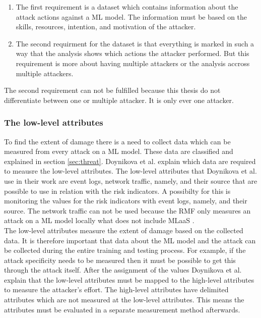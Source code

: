 \begin{enumerate}
  \item The first requirement is a dataset which contains information about the attack actions against a ML model. The information must be based on the skills, resources, intention, and motivation of the attacker.
  \item The second requirment for the dataset is that everything is marked in such a way that the analysis shows which actions the attacker performed. But this requirement is more about having multiple attackers or the analysis accross multiple attackers.
\end{enumerate}

The second requirement can not be fulfilled because this thesis do not differentiate between one or multiple attacker. It is only ever one attacker.

\subsubsection*{The low-level attributes}

To find the extent of damage there is a need to collect data which can be measured from every attack on a ML model. These data are classified and explained in section \ref{sec:threat}. Doynikova et al. \cite{DBLP:conf/crisis/DoynikovaNGK20} explain which data are required to meausre the low-level attributes. The low-level attributes that Doynikova et al. use in their work are event logs, network traffic, namely, and their source that are possible to use in relation with the risk indicators. A possibilty for this is monitoring the values for the risk indicators with event logs, namely, and their source. The network traffic can not be used because the RMF only measures an attack on a ML model locally what does not include MLaaS \cite{DBLP:conf/hci/HaraA21}. \\
The low-level attributes measure the extent of damage based on the collected data. It is therefore important that data about the ML model and the attack can be collected during the entire training and testing process. For example, if the attack specificity needs to be measured then it must be possible to get this through the attack itself. After the assignment of the values Doynikova et al. explain that the low-level attributes must be mapped to the high-level attributes to measure the attacker's effort. The high-level attributes have delimited attributes which are not measured at the low-level attributes. This means the attributes must be evaluated in a separate measurement method afterwards.

